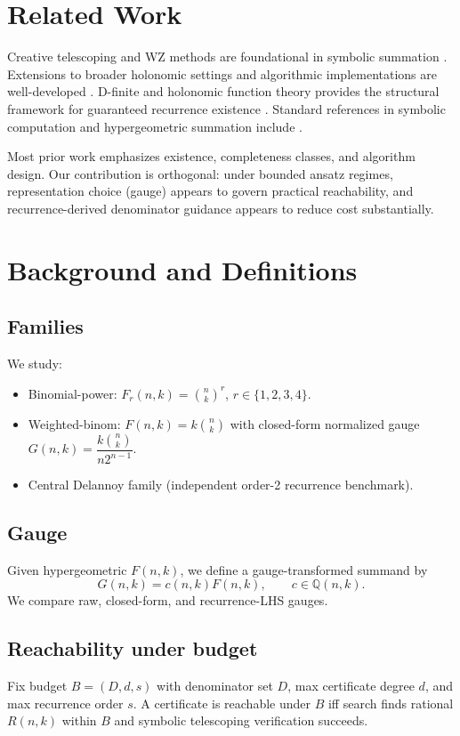 \documentclass[11pt]{article}
\begin{document}
\section{Related Work}
Creative telescoping and WZ methods are foundational in symbolic summation \cite{wilf1992,zeilberger1990,petkovsek1996}. Extensions to broader holonomic settings and algorithmic implementations are well-developed \cite{chyzak2000,kauers2011,schneider2007}. D-finite and holonomic function theory provides the structural framework for guaranteed recurrence existence \cite{stanley1980,lipshitz1989}. Standard references in symbolic computation and hypergeometric summation include \cite{geddes1992,koepf2014}.

Most prior work emphasizes existence, completeness classes, and algorithm design. Our contribution is orthogonal: under bounded ansatz regimes, representation choice (gauge) appears to govern practical reachability, and recurrence-derived denominator guidance appears to reduce cost substantially.

\section{Background and Definitions}
\subsection{Families}
We study:
\begin{itemize}
\item Binomial-power: $F_r(n,k)=\binom{n}{k}^r$, $r\in\{1,2,3,4\}$.
\item Weighted-binom: $F(n,k)=k\binom{n}{k}$ with closed-form normalized gauge $G(n,k)=\dfrac{k\binom{n}{k}}{n2^{n-1}}$.
\item Central Delannoy family (independent order-2 recurrence benchmark).
\end{itemize}

\subsection{Gauge}
Given hypergeometric $F(n,k)$, we define a gauge-transformed summand by
\[
G(n,k)=c(n,k)F(n,k), \qquad c\in\mathbb{Q}(n,k).
\]
We compare raw, closed-form, and recurrence-LHS gauges.

\subsection{Reachability under budget}
Fix budget $B=(D,d,s)$ with denominator set $D$, max certificate degree $d$, and max recurrence order $s$. A certificate is reachable under $B$ iff search finds rational $R(n,k)$ within $B$ and symbolic telescoping verification succeeds.
\end{document}
